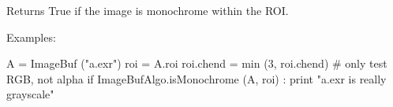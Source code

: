 Returns {\cf True} if the image is monochrome within the ROI.

\smallskip
\noindent Examples:
\begin{code}
    A = ImageBuf ("a.exr")
    roi = A.roi
    roi.chend = min (3, roi.chend)  # only test RGB, not alpha
    if ImageBufAlgo.isMonochrome (A, roi) :
        print "a.exr is really grayscale"
\end{code}
\apiend


\begin{comment}
\apiitem{bool ImageBufAlgo.{\ce color_count} (src, imagesize_t *count,\\
        \bigspc  int ncolors, const float *color, const float *eps=NULL,  \\
        \bigspc  roi=ROI.All, nthreads=0)}
\index{ImageBufAlgo!color_count} \indexapi{color_count}

Count how many pixels in the image (within the ROI) match a list of colors.
The colors to match are in:

\begin{code}
  colors[0 ... nchans-1]
  colors[nchans ... 2*nchans-1]
  ...
  colors[(ncolors-1)*nchans ... (ncolors*nchans)-1]
\end{code}

\noindent and so on, a total of {\cf ncolors} consecutively stored
colors of {\cf nchans} channels each ({\cf nchans} is the number of
channels in the image, itself, it is not passed as a parameter).


The values in {\cf eps[0..nchans-1]} are the error tolerances for a
match, for each channel.  Setting {\cf eps[c]} to 
{\cf numeric_limits<float>::max()} will effectively make it ignore the
channel.  Passing {\cf eps == NULL} will be interpreted as a tolerance
of 0.001 for all channels (requires exact matches for 8 bit images, but
allows a wee bit of imprecision for {\cf float} images.

\smallskip
\noindent Examples:
\begin{code}
    A = ImageBuf ("a.exr")
    n = A.nchannels

    # Try to match two colors: pure red and green
    std::vector<float> colors (2*n, numeric_limits<float>::max());
    colors[0] = 1.0; colors[1] = 0.0; colors[2] = 0.0;
    colors[n+0] = 0.0; colors[n+1] = 1.0; colors[n+2] = 0.0;

    const int ncolors = 2;
    imagesize_t count[ncolors];
    ImageBufAlgo.color_count (A, count, ncolors);
    print "Number of red pixels   : ", count[0]
    print "Number of green pixels : ", count[1]
\end{code}
\apiend



\end{comment}
